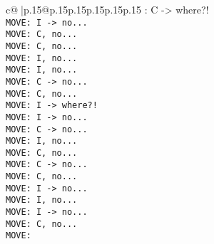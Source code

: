 \documentclass{article}
\begin{document}
{\begin{supertabular}{c@{$\;$}|p{.15\linewidth}@{}p{.15\linewidth}p{.15\linewidth}p{.15\linewidth}p{.15\linewidth}p{.15\linewidth}}
{{{: C -> where?!\\ \tt  MOVE: I -> no...\\ \tt  MOVE: C, no...\\ \tt  MOVE: C, no...\\ \tt  MOVE: I, no...\\ \tt  MOVE: I, no...\\ \tt  MOVE: C -> no...\\ \tt  MOVE: C, no...\\ \tt  MOVE: I -> where?!\\ \tt  MOVE: I -> no...\\ \tt  MOVE: C -> no...\\ \tt  MOVE: I, no...\\ \tt  MOVE: C, no...\\ \tt  MOVE: C -> no...\\ \tt  MOVE: C, no...\\ \tt  MOVE: I -> no...\\ \tt  MOVE: I, no...\\ \tt  MOVE: I -> no...\\ \tt  MOVE: C, no...\\ \tt  MOVE:}}}
\end{supertabular}}
\end{document}
